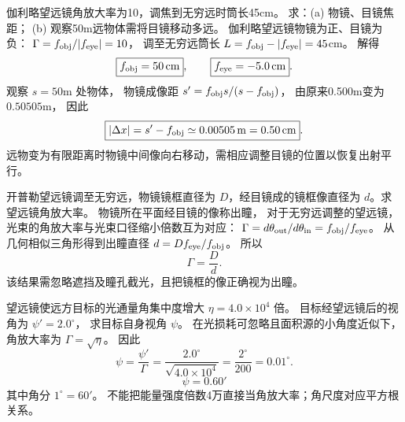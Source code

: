 伽利略望远镜角放大率为10，调焦到无穷远时筒长45cm。
求：(a) 物镜、目镜焦距；
(b) 观察50m远物体需将目镜移动多远。
\exsolution
伽利略望远镜物镜为正、目镜为负：
$\Gamma=f_{\rm obj}/|f_{\rm eye}|=10$，
调至无穷远筒长
$L=f_{\rm obj}-|f_{\rm eye}|=45$cm。
解得
\[
\boxed{f_{\rm obj}=50\,\mathrm{cm}},
\qquad
\boxed{f_{\rm eye}=-5.0\,\mathrm{cm}}.
\]
观察 $s=50$m 处物体，
物镜成像距
$s'=f_{\rm obj}s/(s-f_{\rm obj})$，
由原来0.500m变为
$0.50505$m，
因此
\[
\boxed{|\Delta x|=s'-f_{\rm obj}
\simeq0.00505\,\mathrm m=0.50\,\mathrm{cm}}.
\]
\excheck 远物变为有限距离时物镜中间像向右移动，需相应调整目镜的位置以恢复出射平行。

开普勒望远镜调至无穷远，物镜镜框直径为
$D$，经目镜成的镜框像直径为
$d$。求望远镜角放大率。
\exsolution
物镜所在平面经目镜的像称出瞳，
对于无穷远调整的望远镜，
光束的角放大率与光束口径缩小倍数互为对应：
$\Gamma=d\theta_{\rm out}/d\theta_{\rm in}
=f_{\rm obj}/f_{\rm eye}$。
从几何相似三角形得到出瞳直径
$d=D f_{\rm eye}/f_{\rm obj}$。
所以
\[
\boxed{\Gamma=\frac Dd}.
\]
\excheck 该结果需忽略遮挡及瞳孔截光，且把镜框的像正确视为出瞳。

望远镜使远方目标的光通量角集中度增大
$\eta=4.0\times10^4$ 倍。
目标经望远镜后的视角为
$\psi'=2.0^\circ$，
求目标自身视角 $\psi$。
\exsolution
在光损耗可忽略且面积源的小角度近似下，
角放大率为
$\Gamma=\sqrt\eta$。
因此
\[
\psi=\frac{\psi'}{\Gamma}
=\frac{2.0^\circ}{\sqrt{4.0\times10^4}}
=\frac{2^\circ}{200}
=0.01^\circ.
\]
\[
\boxed{\psi=0.60'}
\]
其中角分 $1^\circ=60'$。
\excheck 不能把能量强度倍数4万直接当角放大率；角尺度对应平方根关系。
